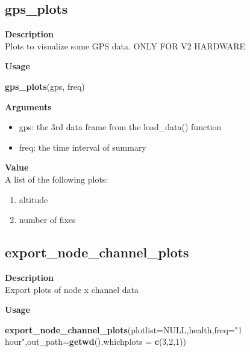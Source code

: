 \documentclass[
]{book}
\newenvironment{Shaded}{\begin{snugshade}}{\end{snugshade}}
\newcommand{\AttributeTok}[1]{\textcolor[rgb]{0.13,0.29,0.53}{#1}}
\newcommand{\ConstantTok}[1]{\textcolor[rgb]{0.56,0.35,0.01}{#1}}
\newcommand{\DecValTok}[1]{\textcolor[rgb]{0.00,0.00,0.81}{#1}}
\newcommand{\FunctionTok}[1]{\textcolor[rgb]{0.13,0.29,0.53}{\textbf{#1}}}
\newcommand{\NormalTok}[1]{#1}
\newcommand{\StringTok}[1]{\textcolor[rgb]{0.31,0.60,0.02}{#1}}
\providecommand{\tightlist}{%
  \setlength{\itemsep}{0pt}\setlength{\parskip}{0pt}}
\begin{document}
\subsection{gps\_plots}\label{gps_plots}

\textbf{Description}\\
Plots to visualize some GPS data. ONLY FOR V2 HARDWARE

\textbf{Usage}

\begin{Shaded}
\begin{Highlighting}[]
\FunctionTok{gps\_plots}\NormalTok{(gps, freq)  }
\end{Highlighting}
\end{Shaded}

\textbf{Arguments}

\begin{itemize}
\tightlist
\item
  gps: the 3rd data frame from the load\_data() function\\
\item
  freq: the time interval of summary
\end{itemize}

\textbf{Value}\\
A list of the following plots:

\begin{enumerate}
\def\labelenumi{\arabic{enumi}.}
\tightlist
\item
  altitude\\
\item
  number of fixes
\end{enumerate}

\subsection{export\_node\_channel\_plots}\label{export_node_channel_plots}

\textbf{Description}\\
Export plots of node x channel data

\textbf{Usage}

\begin{Shaded}
\begin{Highlighting}[]
\FunctionTok{export\_node\_channel\_plots}\NormalTok{(}\AttributeTok{plotlist=}\ConstantTok{NULL}\NormalTok{,health,}\AttributeTok{freq=}\StringTok{"1 hour"}\NormalTok{,}\AttributeTok{out\_path=}\FunctionTok{getwd}\NormalTok{(),}\AttributeTok{whichplots =} \FunctionTok{c}\NormalTok{(}\DecValTok{3}\NormalTok{,}\DecValTok{2}\NormalTok{,}\DecValTok{1}\NormalTok{))}
\end{Highlighting}
\end{Shaded}
\end{document}
